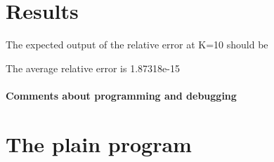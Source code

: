 \section*{Results}

The expected output of the relative error at K=10 should be


\begin{DoxyCode}
The average relative error is 1.87318e-15
\end{DoxyCode}


\label{_Commentsaboutprogramminganddebugging}%
\paragraph*{Comments about programming and debugging }

\label{_PlainProg}%
 \section*{The plain program}


